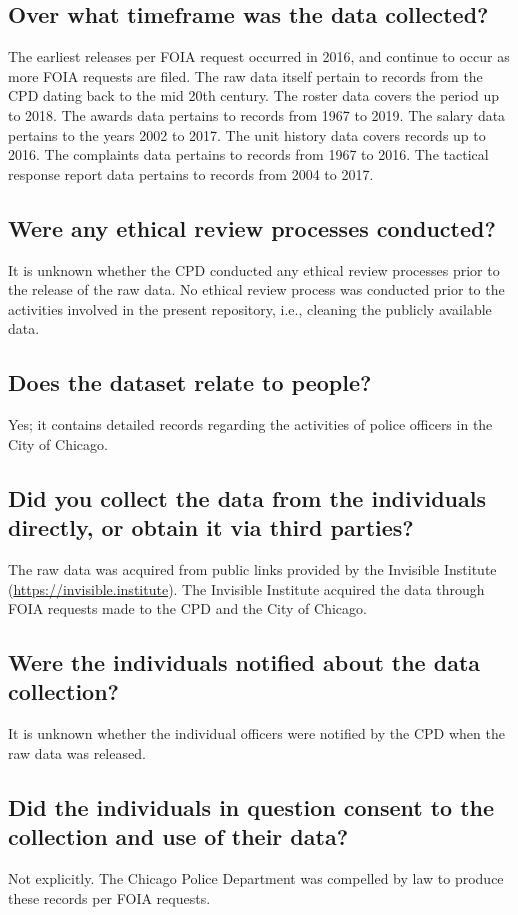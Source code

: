 \documentclass[letterpaper, 10 pt, conference]{ieeeconf}  %
\begin{document}
\subsection{Over what timeframe was the data collected?}
The earliest releases per FOIA request occurred in 2016, and continue to occur
as more FOIA requests are filed. The raw data itself pertain to records from the CPD
dating back to the mid 20th century. The roster data covers the period up
to 2018. The awards data pertains to records from 1967 to 2019.
The salary data pertains to the years 2002 to 2017. The unit history data covers records up
to 2016. The complaints data pertains to records from 1967 to 2016. The tactical response 
report data pertains to records from 2004 to 2017.

\subsection{Were any ethical review processes conducted?}
It is unknown whether the CPD conducted any ethical review processes prior to the release
of the raw data. No ethical review process was conducted prior to the activities
involved in the present repository, i.e., cleaning the publicly available data.

\subsection{Does the dataset relate to people?}
Yes; it contains detailed records regarding the activities of police officers in the City of Chicago.

\subsection{Did you collect the data from the individuals directly, or obtain it via third parties?}
The raw data was acquired from public links provided by the Invisible Institute (\url{https://invisible.institute}).
The Invisible Institute acquired the data through FOIA requests made to the CPD and the City of Chicago.

\subsection{Were the individuals notified about the data collection?}
It is unknown whether the individual officers were notified by the CPD when the raw data was released. 

\subsection{Did the individuals in question consent to the collection and use of their data?}
Not explicitly. The Chicago Police Department was compelled by law to produce these records per FOIA requests.
\end{document}
